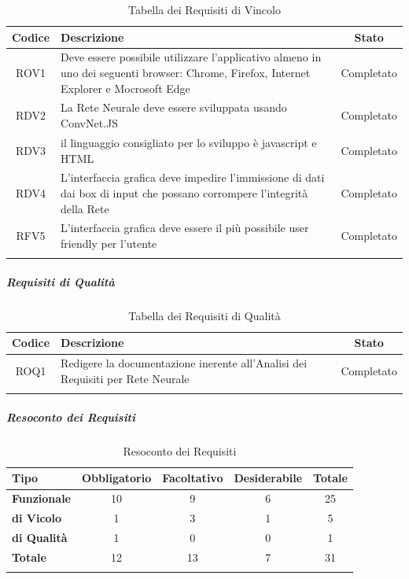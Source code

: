 \begin{longtable}{|c|p{7cm}|c|}
	\hline
	\textbf{Codice} & \textbf{Descrizione} & \textbf{Stato} \\\hline\hline
	   
	   ROV1 & Deve essere possibile utilizzare l'applicativo almeno in uno dei seguenti browser: Chrome, Firefox, Internet Explorer e Mocrosoft Edge & Completato  \\
	   \hline
	   RDV2 & La Rete Neurale deve essere sviluppata usando ConvNet.JS & Completato  \\
	   \hline
	   RDV3 & il linguaggio consigliato per lo sviluppo \`e javascript e HTML  & Completato \\
	   \hline
	   RDV4 & L'interfaccia grafica deve impedire l'immissione di dati dai box di input che possano corrompere  l'integrit\`a della Rete & Completato \\
	   \hline
	   RFV5 & L'interfaccia grafica deve essere il pi\`u possibile user friendly per l'utente & Completato \\
	   \hline

\caption{Tabella dei Requisiti di Vincolo}\label{tab:requisiti di vincolo}
\end{longtable}

\subparagraph{Requisiti di Qualit\`a}\mbox{}
\label{Requisiti di Qualita}

\begin{longtable}{|c|p{7cm}|c|}
	\hline
	\textbf{Codice} & \textbf{Descrizione} & \textbf{Stato} \\\hline\hline
	
	   ROQ1 & Redigere la documentazione inerente all'Analisi dei Requisiti per Rete Neurale & Completato  \\
	   \hline
	
\caption{Tabella dei Requisiti di Qualit\`a}\label{tab:requisiti di qualita}
\end{longtable}


\subparagraph{Resoconto dei Requisiti}\mbox{}
\label{Resoconto dei Requisiti}


\begin{longtable}{|l|c|c|c|c|}
	\hline
	\textbf{Tipo} & \textbf{Obbligatorio} & \textbf{Facoltativo} & \textbf{Desiderabile} & \textbf{Totale} \\\hline\hline
	   
\textbf{Funzionale} & 10 & 9 & 6 & 25 \\
	   \hline
\textbf{di Vicolo} & 1 & 3 & 1 & 5 \\
	   \hline
\textbf{di Qualit\`a} & 1 & 0 & 0 & 1 \\
	   \hline
\textbf{Totale} & 12 & 13 & 7 & 31 \\
\hline

\caption{Resoconto dei Requisiti}\label{tab:resoconto dei requisiti}
\end{longtable}


